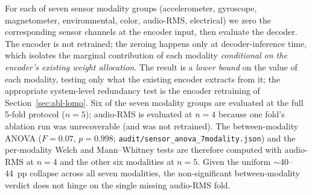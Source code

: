 \documentclass[sensors,article,submit,moreauthors,pdftex]{Definitions/mdpi}
\begin{document}
For each of seven sensor modality groups (accelerometer, gyroscope, magnetometer, environmental, color, audio-RMS, electrical) we zero the corresponding sensor channels at the encoder input, then evaluate the decoder. The encoder is not retrained; the zeroing happens only at decoder-inference time, which isolates the marginal contribution of each modality \emph{conditional on the encoder's existing weight allocation}. The result is a \emph{lower bound} on the value of each modality, testing only what the existing encoder extracts from it; the appropriate system-level redundancy test is the encoder retraining of Section~\ref{sec:abl-lomo}. Six of the seven modality groups are evaluated at the full 5-fold protocol ($n=5$); audio-RMS is evaluated at $n=4$ because one fold's ablation run was unrecoverable (and was not retrained). The between-modality ANOVA ($F\!=\!0.07$, $p\!=\!0.998$; \texttt{audit/sensor\_anova\_7modality.json}) and the per-modality Welch and Mann--Whitney tests are therefore computed with audio-RMS at $n=4$ and the other six modalities at $n=5$. Given the uniform $\sim$40--44~pp collapse across all seven modalities, the non-significant between-modality verdict does not hinge on the single missing audio-RMS fold.
\end{document}

